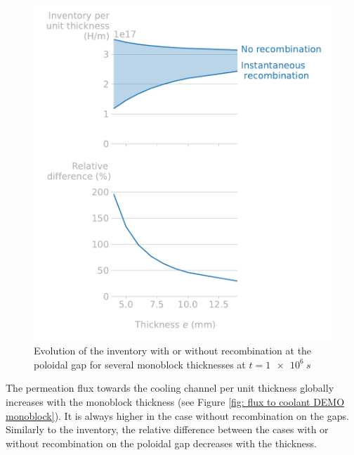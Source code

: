 \begin{figure} [h]
    \centering
    \includegraphics[width=\linewidth]{Figures/Chapter3/monoblocks/3D_monoblocks/inventory_vs_thickness.pdf}
    \caption{Evolution of the inventory with or without recombination at the poloidal gap for several monoblock thicknesses at $t=\SI{1e6}{s}$}
    \label{fig: ratio 3D thickness monoblock}
\end{figure}

The permeation flux towards the cooling channel per unit thickness globally increases with the monoblock thickness (see Figure \ref{fig: flux to coolant DEMO monoblock}).
It is always higher in the case without recombination on the gaps.
Similarly to the inventory, the relative difference between the cases with or without recombination on the poloidal gap decreases with the thickness.

